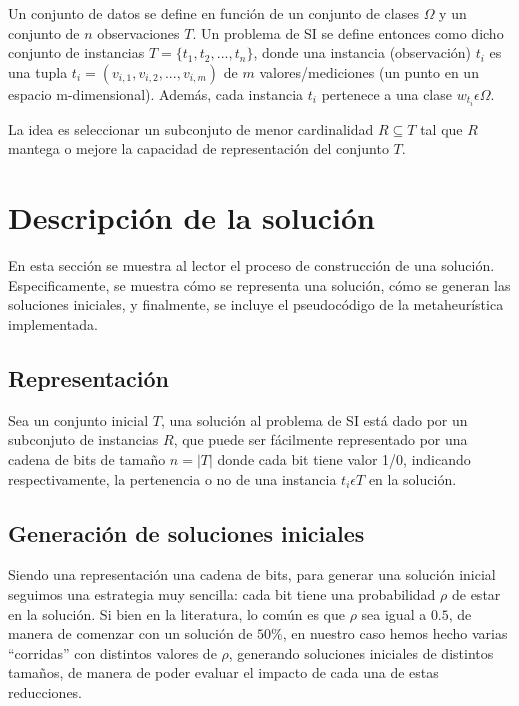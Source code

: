 \documentclass[11pt]{article}
\begin{document}
Un conjunto de datos se define en función de un conjunto de clases $\Omega$ y
un conjunto de $n$ observaciones $T$. Un problema de SI se define entonces como dicho 
conjunto de instancias 
$T = \{t_{1}, t_{2},..., t_{n}\}$, donde una instancia (observación) $t_{i}$ es
una tupla $t_{i} = (v_{i,1}, v_{i,2},...,v_{i,m})$ de $m$ valores/mediciones
(un punto en un espacio m-dimensional). Además, cada instancia $t_{i}$
pertenece a una clase $w_{t_{i}}  \epsilon  \Omega$. 

La idea es seleccionar un subconjuto de menor cardinalidad 
$R \subseteq T$ tal que $R$ mantega o mejore la capacidad 
de representación del conjunto $T$.

\section{Descripción de la solución}

En esta sección se muestra al lector el proceso de construcción de una 
solución. Especificamente, se muestra cómo se representa una solución,
cómo se generan las soluciones iniciales, y finalmente, se incluye 
el pseudocódigo de la metaheurística implementada.

\subsection{Representación}

Sea un conjunto inicial $T$, una solución al problema de SI está
dado por un subconjuto de instancias $R$,
que puede ser fácilmente representado por una cadena de bits de 
tamaño $n = |T|$ donde cada bit tiene valor 1/0, indicando respectivamente,
la pertenencia o no de una instancia $t_{i} \epsilon T$ en la solución. 

\subsection{Generación de soluciones iniciales}

Siendo una representación una cadena de bits, para generar una solución
inicial seguimos una estrategia muy sencilla: cada bit tiene una probabilidad $\rho$
de estar en la solución. Si bien en la literatura, lo común es
que $\rho$ sea igual a $0.5$, de manera de comenzar con un solución
de $50\%$, en nuestro caso hemos hecho varias ``corridas'' con distintos valores
de $\rho$, generando soluciones iniciales de distintos tamaños, de manera de poder
evaluar el impacto de cada una de estas reducciones.
\end{document}
